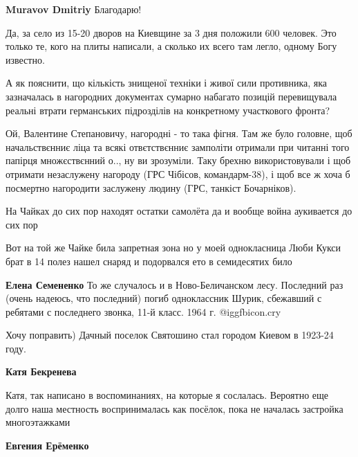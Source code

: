 \begin{itemize}
\begin{itemize}
\begin{itemize}
\textbf{Muravov Dmitriy} Благодарю!
\end{itemize} %


Да, за село из 15-20 дворов на Киевщине за 3 дня положили 600 человек. Это
только те, кого на плиты написали, а сколько их всего там легло, одному Богу
известно.


А як пояснити, що кількість знищеної техніки і живої сили противника, яка
зазначалась в нагородних документах сумарно набагато позицій перевищувала
реальні втрати германських підрозділів на конкретному участкового фронта?


Ой, Валентине Степановичу, нагородні - то така фігня. Там же було головне, щоб
начальствєнниє ліца та всякі отвєтствєнниє замполіти отримали при читанні того
папірця множєствєнний о.., ну ви зрозуміли. Таку брехню використовували і щоб
отримати незаслужену нагороду (ГРС Чібісов, командарм-38), і щоб все ж хоча б
посмертно нагородити заслужену людину (ГРС, танкіст Бочарніков).

\end{itemize} %


На Чайках до сих пор находят остатки самолёта да и вообще война аукивается до
сих пор

Вот на той же Чайке била запретная зона но у моей однокласница Люби Кукси брат
в 14 полез нашел снаряд и подорвался ето в семидесятих било

\begin{itemize} %
\textbf{Елена Семененко} То же случалось и в Ново-Беличанском лесу. Последний раз (очень надеюсь, что последний) погиб одноклассник Шурик, сбежавший с ребятами с последнего звонка, 11-й класс. 1964 г. @igg{fbicon.cry} 
\end{itemize} %

Хочу поправить) Дачный поселок Святошино стал городом Киевом в 1923-24 году.

\begin{itemize} %
\textbf{Катя Бекренева} 

Катя, так написано в воспоминаниях, на которые я сослалась. Вероятно еще долго
наша местность воспринималась как посёлок, пока не началась застройка
многоэтажками

\begin{itemize} %
\textbf{Евгения Ерёменко} 


\end{itemize}
\end{itemize}
\end{itemize}
